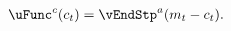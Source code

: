   \begin{equation}\begin{gathered}\begin{aligned}
        \uFunc^{c}(c_{\stp})   & = \vEndStp^{a}(m_{\stp}-c_{\stp}).
        \label{eq:upEqbetaOp}
      \end{aligned}\end{gathered}\end{equation}
